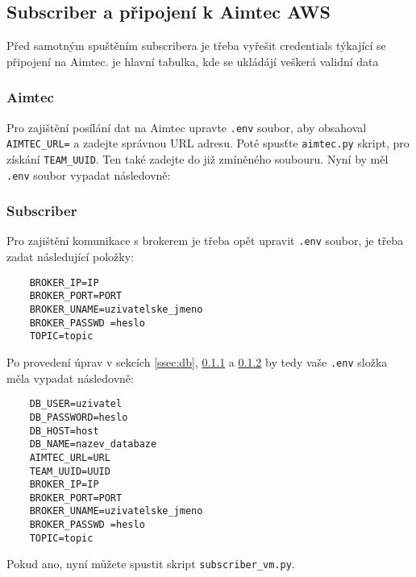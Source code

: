 \subsection{Subscriber a připojení k Aimtec AWS}
Před samotným spuštěním subscribera je třeba vyřešit credentials týkající se připojení na Aimtec. je hlavní tabulka, kde se ukládájí veškerá validní data
\subsubsection{Aimtec}
\label{sssec:aimtec}
Pro zajištění posílání dat na Aimtec upravte \verb|.env| soubor, aby obsahoval \verb|AIMTEC_URL=| a zadejte správnou URL adresu. Poté spusťte \verb|aimtec.py| skript, pro získání \verb|TEAM_UUID|. Ten také zadejte do již zmíněného soubouru.
Nyní by měl \verb|.env| soubor vypadat následovně:

\subsubsection{Subscriber}
\label{sssec:subscriber}
Pro zajištění komunikace s brokerem je třeba opět upravit \verb|.env| soubor, je třeba zadat následující položky:
\begin{verbatim}
    BROKER_IP=IP
    BROKER_PORT=PORT  
    BROKER_UNAME=uzivatelske_jmeno
    BROKER_PASSWD =heslo
    TOPIC=topic
\end{verbatim}
Po provedení úprav v sekcích \ref{ssec:db}, \ref{sssec:aimtec} a \ref{sssec:subscriber} by tedy vaše \verb|.env| složka měla vypadat následovně: 

\begin{verbatim}
    DB_USER=uzivatel
    DB_PASSWORD=heslo
    DB_HOST=host
    DB_NAME=nazev_databaze
    AIMTEC_URL=URL
    TEAM_UUID=UUID
    BROKER_IP=IP
    BROKER_PORT=PORT  
    BROKER_UNAME=uzivatelske_jmeno
    BROKER_PASSWD =heslo
    TOPIC=topic
\end{verbatim}
Pokud ano, nyní můžete spustit skript \verb|subscriber_vm.py|. 
